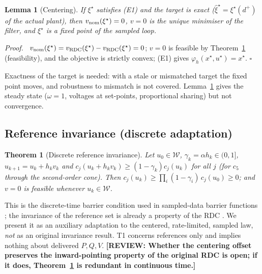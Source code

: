 \documentclass[11pt,twocolumn]{article}
\newtheorem{theorem}{Theorem}
\newtheorem{lemma}{Lemma}
\newenvironment{proof}{\par\noindent\textit{Proof.}\ }{\hfill$\square$\par}
\newcommand{\todo}[1]{\textbf{[REVIEW: #1]}}
\begin{document}
\begin{lemma}[Centering]
\label{lem:c}
If $\xi^\star$ satisfies (E1) and the target is exact ($\hat\xi^\star=\xi^\star(d^+)$ of the actual plant), then $v_{\rm nom}(\xi^\star)=0$, $v=0$ is the unique minimiser of the filter, and $\xi^\star$ is a fixed point of the sampled loop.
\end{lemma}
\begin{proof}
$v_{\rm nom}(\xi^\star)=v_{\rm RDC}(\xi^\star)-v_{\rm RDC}(\xi^\star)=0$; $v=0$ is feasible by Theorem~\ref{thm:t1} (feasibility), and the objective is strictly convex; (E1) gives $\varphi_h(x^\star,u^\star)=x^\star$.
\end{proof}
Exactness of the target is needed: with a stale or mismatched target the fixed point moves, and robustness to mismatch is not covered. Lemma~\ref{lem:c} gives the steady state ($\omega=1$, voltages at set-points, proportional sharing) but not convergence.

\subsection{Reference invariance (discrete adaptation)}
\begin{theorem}[Discrete reference invariance]
\label{thm:t1}
Let $u_0\in\mathcal W$, $\gamma_k=\alpha h_k\in(0,1]$, $u_{k+1}=u_k+h_kv_k$ and $c_j(u_k+h_kv_k)\ge(1-\gamma_k)c_j(u_k)$ for all $j$ (for $c_5$ through the second-order cone). Then $c_j(u_k)\ge\prod_i(1-\gamma_i)\,c_j(u_0)\ge0$; and $v=0$ is feasible whenever $u_k\in\mathcal W$.
\end{theorem}
This is the discrete-time barrier condition used in sampled-data barrier functions \cite{Breeden2021Sampled}; the invariance of the reference set is already a property of the RDC \cite{Kavvathas2025Resilient}. We present it as an auxiliary adaptation to the centered, rate-limited, sampled law, \emph{not} as an original invariance result. T1 concerns references only and implies nothing about delivered $P,Q,V$. \todo{Whether the centering offset preserves the inward-pointing property of the original RDC is open; if it does, Theorem~\ref{thm:t1} is redundant in continuous time.}
\end{document}
